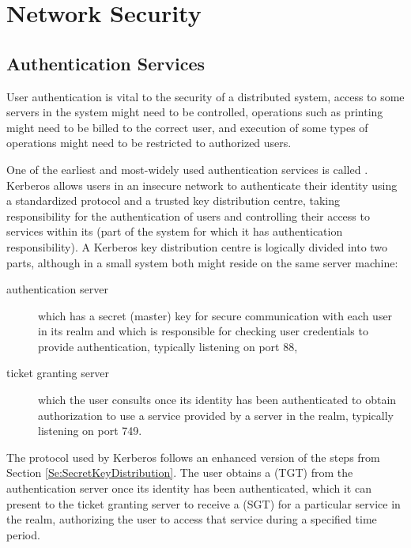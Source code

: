 
\chapter{Network Security}


\section{Authentication Services}\label{Se:AuthenticationServices}
User authentication is vital to the security of a distributed system,
access to some servers in the system might need to be controlled,
operations such as printing might need to be billed to the correct user,
and execution of some types of operations might need to be restricted to authorized users.

One of the earliest and most-widely used authentication services is called
. Kerberos allows users in an insecure network to
authenticate their identity using a standardized protocol and a trusted
key distribution centre, taking responsibility for the authentication of
users and controlling their access to services within its 
(part of the system for which it has authentication responsibility).
A Kerberos key distribution centre is logically divided into two parts,
although in a small system both might reside on the same server machine:
\begin{description}
  \item[authentication server] which has a secret (master) key for secure communication
  with each user in its realm and which is responsible for checking user
  credentials to provide authentication, typically listening on port 88,
  \item[ticket granting server] which the user consults once its identity
  has been authenticated to obtain authorization to use a service
  provided by a server in the realm, typically listening on port 749.
\end{description}
The protocol used by Kerberos follows an enhanced version of the steps
from Section \ref{Se:SecretKeyDistribution}.
The user obtains a  (TGT) from the authentication
server once its identity has been authenticated, which it can present
to the ticket granting server to receive a  (SGT)
for a particular service in the realm, authorizing the user to access that
service during a specified time period.

